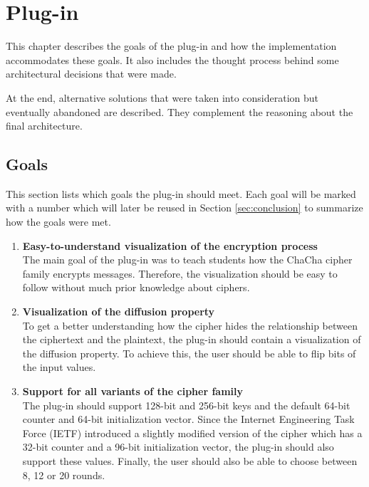 
\chapter{Plug-in}
\label{chap:Plugin}

This chapter describes the goals of the plug-in and how the implementation accommodates these goals. It also includes the thought process behind some architectural decisions that were made.

At the end, alternative solutions that were taken into consideration but eventually abandoned are described. They complement the reasoning about the final architecture.

\section{Goals}
\label{sec:goals}

This section lists which goals the plug-in should meet. Each goal will be marked with a number which will later be reused in Section \ref{sec:conclusion} to summarize how the goals were met.

\begin{enumerate}[label=(\labelenum{G}{{\arabic*}})]
  \item \textbf{Easy-to-understand visualization of the encryption process}\\
The main goal of the plug-in was to teach students how the ChaCha cipher family encrypts messages. Therefore, the visualization should be easy to follow without much prior knowledge about ciphers.
  \item \textbf{Visualization of the diffusion property}\\
To get a better understanding how the cipher hides the relationship between the ciphertext and the plaintext, the plug-in should contain a visualization of the diffusion property. To achieve this, the user should be able to flip bits of the input values.
  \item \textbf{Support for all variants of the cipher family}\\
The plug-in should support 128-bit and 256-bit keys and the default 64-bit counter and 64-bit initialization vector. Since the Internet Engineering Task Force (IETF) introduced a slightly modified version of the cipher which has a 32-bit counter and a 96-bit initialization vector, the plug-in should also support these values. Finally, the user should also be able to choose between 8, 12 or 20 rounds.
\end{enumerate}

